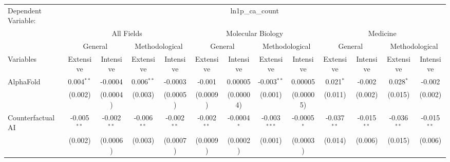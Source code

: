 \begingroup
\centering
\begin{tabular}{lcccccccccccc}
   \tabularnewline \midrule \midrule
   Dependent Variable: & \multicolumn{12}{c}{ln1p\_ca\_count}\\
 & \multicolumn{4}{c}{All Fields} & \multicolumn{4}{c}{Molecular Biology} & \multicolumn{4}{c}{Medicine} \\
\cmidrule(lr){2-5} \cmidrule(lr){6-9} \cmidrule(lr){10-13}
 & \multicolumn{2}{c}{General} & \multicolumn{2}{c}{Methodological} & \multicolumn{2}{c}{General} & \multicolumn{2}{c}{Methodological} & \multicolumn{2}{c}{General} & \multicolumn{2}{c}{Methodological} \\
\cmidrule(lr){2-3} \cmidrule(lr){4-5} \cmidrule(lr){6-7} \cmidrule(lr){8-9} \cmidrule(lr){10-11} \cmidrule(lr){12-13}
Variables & \multicolumn{1}{c}{Extensive} & \multicolumn{1}{c}{Intensive} & \multicolumn{1}{c}{Extensive} & \multicolumn{1}{c}{Intensive} & \multicolumn{1}{c}{Extensive} & \multicolumn{1}{c}{Intensive} & \multicolumn{1}{c}{Extensive} & \multicolumn{1}{c}{Intensive} & \multicolumn{1}{c}{Extensive} & \multicolumn{1}{c}{Intensive} & \multicolumn{1}{c}{Extensive} & \multicolumn{1}{c}{Intensive} \\
\cmidrule(lr){1-1}\cmidrule(lr){2-2} \cmidrule(lr){3-3} \cmidrule(lr){4-4} \cmidrule(lr){5-5} \cmidrule(lr){6-6} \cmidrule(lr){7-7} \cmidrule(lr){8-8} \cmidrule(lr){9-9} \cmidrule(lr){10-10} \cmidrule(lr){11-11} \cmidrule(lr){12-12} \cmidrule(lr){13-13}
   AlphaFold                                & 0.004$^{**}$  & -0.0004         & 0.006$^{**}$  & -0.0003         & -0.001        & 0.00005       & -0.003$^{**}$  & 0.00005       & 0.021$^{*}$   & -0.002         & 0.028$^{*}$   & -0.002\\   
                                            & (0.002)       & (0.0004)        & (0.003)       & (0.0005)        & (0.0009)      & (0.00004)     & (0.001)        & (0.00005)     & (0.011)       & (0.002)        & (0.015)       & (0.002)\\   
   Counterfactual AI                        & -0.005$^{**}$ & -0.002$^{**}$   & -0.006$^{**}$ & -0.002$^{**}$   & -0.002$^{**}$ & -0.0004$^{*}$ & -0.003$^{***}$ & -0.0005$^{*}$ & -0.037$^{**}$ & -0.015$^{**}$  & -0.036$^{**}$ & -0.015$^{**}$\\   
                                            & (0.002)       & (0.0006)        & (0.003)       & (0.0007)        & (0.0009)      & (0.0002)      & (0.001)        & (0.0003)      & (0.014)       & (0.006)        & (0.015)       & (0.006)\\   

\end{tabular}
